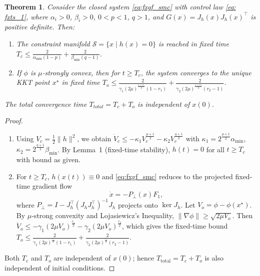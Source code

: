 \documentclass[10pt,a4paper]{amsart}
\newtheorem{theorem}{Theorem}
\begin{document}
\begin{theorem}
Consider the closed system \eqref{eq:fxgf_smc} with control law \eqref{eq: fxts_1}, where 
$\alpha_i>0$, $\beta_i>0$, $0<p<1$, $q>1$, and $G(x)=J_h(x)J_h(x)^\top$ is positive definite.
Then:
\begin{enumerate}
    \item The constraint manifold $\mathcal{S}=\{x\mid h(x)=0\}$ is reached in fixed time $T_c \le \frac{2}{\alpha_{\min}(1-p)} + \frac{2}{\beta_{\min}(q-1)}$.
   
    \item If $\phi$ is $\mu$-strongly convex, then for $t\ge T_c$, the system converges to 
    the unique KKT point $x^\star$ in fixed time $T_o \le \frac{2}{\gamma_1(2\mu)^{\frac{1+r_1}{2}}(1-r_1)} + \frac{2}{\gamma_2(2\mu)^{\frac{1+r_2}{2}}(r_2-1)}$.
\end{enumerate}
The total convergence time $T_{total}=T_c+T_o$ is independent of $x(0)$.
\end{theorem}

\begin{proof}
\begin{enumerate}
    \item Using $V_c=\frac{1}{2}\|h\|^2$, we obtain $\dot{V}_c \leq -\kappa_1 V_c^{\frac{p+1}{2}} - \kappa_2 V_c^{\frac{q+1}{2}}$ with $\kappa_1=2^{\frac{p+1}{2}}\alpha_{\min}$, $\kappa_2=2^{\frac{q+1}{2}}\beta_{\min}$. By Lemma~1 (fixed-time stability), $h(t)=0$ for all $t\geq T_c$ with bound as given.

    \item For $t \geq T_c$, $h(x(t)) \equiv 0$ and \eqref{eq:fxgf_smc} reduces to the projected fixed-time gradient flow
\[
\dot{x} = -P_\perp(x)F_1,
\]
where $P_\perp = I - J_h^\top(J_h J_h^\top)^{-1}J_h$ projects onto $\ker J_h$. Let $V_o = \phi - \phi(x^\star)$. By $\mu$-strong convexity and Lojasiewicz’s Inequality, $\|\nabla\phi\| \geq \sqrt{2\mu V_o}$. Then $\dot{V}_o \leq -\gamma_1(2\mu V_o)^{\frac{r_1}{2}} - \gamma_2(2\mu V_o)^{\frac{r_2}{2}}$, which gives the fixed-time bound $T_o \leq \frac{2}{\gamma_1(2\mu)^{\frac{r_1}{2}}(1-r_1)} + \frac{2}{\gamma_2(2\mu)^{\frac{r_2}{2}}(r_2-1)}$.
\end{enumerate}
Both $T_c$ and $T_o$ are independent of $x(0)$; hence $T_{\mathrm{total}} = T_c + T_o$ is also independent of initial conditions.
\end{proof}
\end{document}
